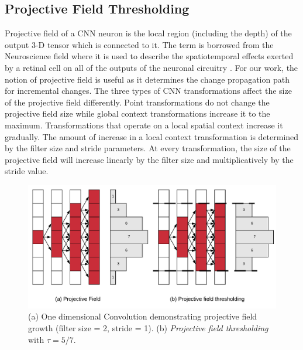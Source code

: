 \subsection{Projective Field Thresholding}
Projective field \cite{le2017receptive, basiccnnoperations} of a CNN neuron is the local region (including the depth) of the output 3-D tensor which is connected to it.
The term is borrowed from the Neuroscience field where it is used to describe the spatiotemporal effects exerted by a retinal cell on all of the outputs of the neuronal circuitry \cite{de2011projective}.
For our work, the notion of projective field is useful as it determines the change propagation path for incremental changes.
The three types of CNN transformations affect the size of the projective field differently.
Point transformations do not change the projective field size while global context transformations increase it to the maximum.
Transformations that operate on a local spatial context increase it gradually.
The amount of increase in a local context transformation is determined by the filter size and stride parameters.
At every transformation, the size of the projective field will increase linearly by the filter size and multiplicatively by the stride value.

\begin{figure}[t]
\includegraphics[width=\columnwidth]{images/pf_truncate}
\caption{(a) One dimensional Convolution demonstrating projective field growth (filter size = 2, stride = 1). (b) \textit{Projective field thresholding} with $\tau = 5/7$.}
\label{fig:pf_truncate}
\end{figure}

